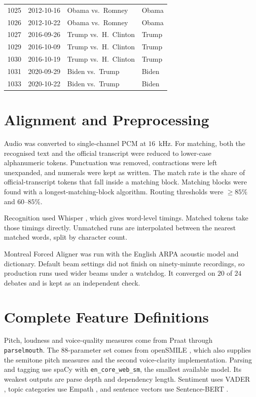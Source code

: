 \documentclass[pdflatex,sn-mathphys-num]{sn-jnl}%
\begin{document}
\begin{appendices}
\begin{table}[h]
\begin{tabular}{llp{}l}
1025 & 2012-10-16 & Obama vs.\ Romney & Obama \\
1026 & 2012-10-22 & Obama vs.\ Romney & Obama \\
1027 & 2016-09-26 & Trump vs.\ H.\ Clinton & Trump \\
1029 & 2016-10-09 & Trump vs.\ H.\ Clinton & Trump \\
1030 & 2016-10-19 & Trump vs.\ H.\ Clinton & Trump \\
1031 & 2020-09-29 & Biden vs.\ Trump & Biden \\
1033 & 2020-10-22 & Biden vs.\ Trump & Biden \\
\bottomrule
\end{tabular}
\end{table}

\section{Alignment and Preprocessing}
\label{app:align}

Audio was converted to single-channel PCM at $16$~kHz. For matching, both the
recognised text and the official transcript were reduced to lower-case
alphanumeric tokens. Punctuation was removed, contractions were left
unexpanded, and numerals were kept as written. The match rate is the share
of official-transcript tokens that fall inside a matching block. Matching
blocks were found with a longest-matching-block algorithm. Routing
thresholds were $\geq 85\%$ and $60$--$85\%$.

Recognition used Whisper \cite{radford2023whisper}, which gives word-level
timings. Matched tokens take those timings directly. Unmatched runs are
interpolated between the nearest matched words, split by character count.

Montreal Forced Aligner \cite{mcauliffe2017mfa} was run with the English ARPA
acoustic model and dictionary. Default beam settings did not finish on
ninety-minute recordings, so production runs used wider beams under a
watchdog. It converged on $20$ of $24$ debates and is kept as an independent
check.

\section{Complete Feature Definitions}
\label{app:features}
\label{app:tools}

Pitch, loudness and voice-quality measures come from Praat
\cite{boersma2024praat} through \texttt{parselmouth}. The $88$-parameter set
comes from openSMILE \cite{eyben2010opensmile,eyben2016gemaps}, which also
supplies the semitone pitch measures and the second voice-clarity
implementation. Parsing and tagging use spaCy \cite{honnibal2020spacy} with
\texttt{en\_core\_web\_sm}, the smallest available model. Its weakest
outputs are parse depth and dependency length. Sentiment uses VADER
\cite{hutto2014vader}, topic categories use Empath \cite{fast2016empath}, and
sentence vectors use Sentence-BERT \cite{reimers2019sbert}.


\end{appendices}
\end{document}
